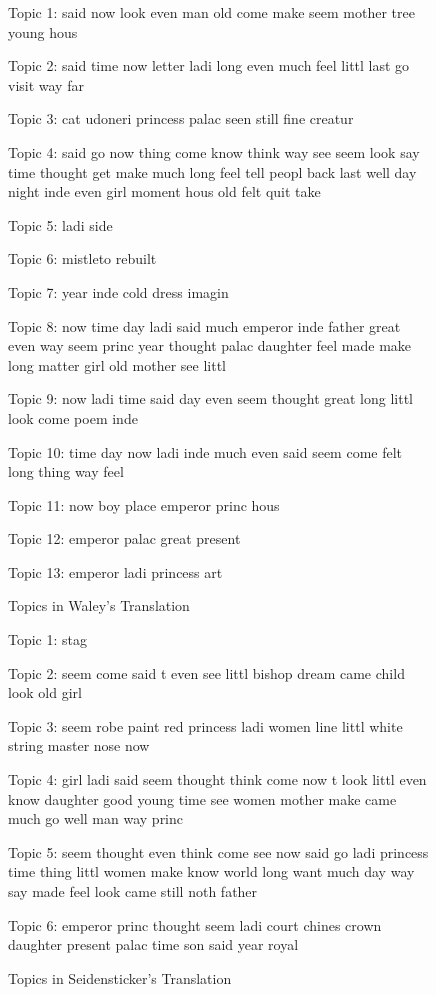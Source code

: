 \documentclass[12pt]{article}
\begin{document}
\begin{flushleft}
\begin{spacing}{2.0}
\begin{figure}
\label{waley-topics}
\caption{Topics in Waley's Translation}
\singlespacing
\small
Topic 1: said now look even man old come make seem mother tree young hous 

Topic 2: said time now letter ladi long even much feel littl last go visit way far 

Topic 3: cat udoneri princess palac seen still fine creatur 

Topic 4: said go now thing come know think way see seem look say time thought get make much long feel tell peopl back last well day night inde even girl moment hous old felt quit take 

Topic 5: ladi side 

Topic 6: mistleto rebuilt 

Topic 7: year inde cold dress imagin 

Topic 8: now time day ladi said much emperor inde father great even way seem princ year thought palac daughter feel made make long matter girl old mother see littl 

Topic 9: now ladi time said day even seem thought great long littl look come poem inde 

Topic 10: time day now ladi inde much even said seem come felt long thing way feel 

Topic 11: now boy place emperor princ hous 

Topic 12: emperor palac great present 

Topic 13: emperor ladi princess art 
\end{figure}


\begin{figure}
\label{seidensticker-topics}
\caption{Topics in Seidensticker's Translation}
\singlespacing
\small
Topic 1: stag 

Topic 2: seem come said t even see littl bishop dream came child look old girl 

Topic 3: seem robe paint red princess ladi women line littl white string master nose now 

Topic 4: girl ladi said seem thought think come now t look littl even know daughter good young time see women mother make came much go well man way princ 

Topic 5: seem thought even think come see now said go ladi princess time thing littl women make know world long want much day way say made feel look came still noth father 

Topic 6: emperor princ thought seem ladi court chines crown daughter present palac time son said year royal 


\end{figure}
\end{spacing}
\end{flushleft}
\end{document}
